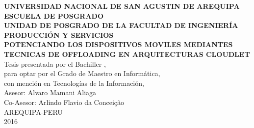 \documentclass[12pt, a4paper, oneside]{Thesis} %
\begin{document}
\begin{titlepage}
\begin{center}


\large \textbf{UNIVERSIDAD NACIONAL DE SAN AGUSTIN DE AREQUIPA} \\ [0.5cm] %
\large \textbf{ESCUELA DE POSGRADO} \\ [0.5cm] %
\large \textbf{UNIDAD DE POSGRADO DE LA FACULTAD DE INGENIERÍA PRODUCCIÓN Y SERVICIOS} \\ [2cm]
\large \textbf{POTENCIANDO LOS DISPOSITIVOS MOVILES MEDIANTES TECNICAS DE OFFLOADING EN ARQUITECTURAS CLOUDLET} \\ [2cm] %

\large {Tesis presentada por el Bachiller \authornames, \\
para optar por el Grado de Maestro en Informática, \\
con mención en Tecnologías de la Información, \\
Asesor: Alvaro Mamani Aliaga \\
Co-Asesor: Arlindo Flavio da Conceição} \\ [2.5cm]


\Large{AREQUIPA-PERU \\
2016}

 

\begin{minipage}{0.4\textwidth}
\begin{flushright} \large
\end{flushright}
\end{minipage} %
 

\end{center}
\end{titlepage}
\end{document}
